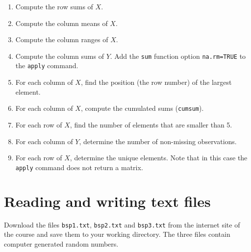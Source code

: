 \documentclass{article}
\begin{document}
\begin{enumerate}
\item Compute the row sums of $X$.

\item Compute the column means of $X$.

\item Compute the column ranges of $X.$

\item Compute the column sums of $Y$. Add the \texttt{sum} function option 
\texttt{na.rm=TRUE} to the \texttt{apply} command.

\item For each column of $X$, find the position (the row number) of the
largest element.

\item For each column of $X$, compute the cumulated sums (\texttt{cumsum}).

\item For each row of $X$, find the number of elements that are smaller than
5.

\item For each column of $Y$, determine the number of non-missing
observations.

\item For each row of $X$, determine the unique elements. Note that in this
case the \texttt{apply} command does not return a matrix.
\end{enumerate}
\newpage


\section{Reading and writing text files}

Download the files \texttt{bsp1.txt}, \texttt{bsp2.txt} and \texttt{bsp3.txt}
from the internet site of the course and save them to your working
directory. The three files contain computer generated random numbers.
\end{document}
